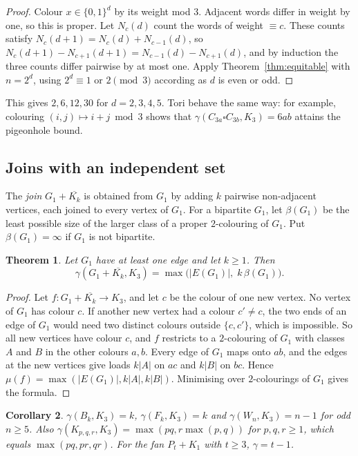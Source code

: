 \documentclass{article}
\newtheorem{theorem}{Theorem}[section]
\newtheorem{corollary}[theorem]{Corollary}
\theoremstyle{definition}
\begin{document}
\begin{proof}
Colour $x\in\{0,1\}^d$ by its weight mod $3$.  Adjacent words differ in weight by
one, so this is proper.  Let $N_c(d)$ count the words of weight $\equiv c$.  These
counts satisfy $N_c(d+1)=N_c(d)+N_{c-1}(d)$, so
$N_c(d+1)-N_{c+1}(d+1)=N_{c-1}(d)-N_{c+1}(d)$, and by induction the three counts
differ pairwise by at most one.  Apply Theorem~\ref{thm:equitable} with
$n=2^d$, using $2^d\equiv1$ or $2\pmod 3$ according as $d$ is even or odd.
\end{proof}

This gives $2,6,12,30$ for $d=2,3,4,5$.  Tori behave the same way: for
example, colouring $(i,j)\mapsto i+j\bmod 3$ shows that
$\gamma(C_{3a}\square C_{3b},K_3)=6ab$ attains the pigeonhole bound.

\subsection{Joins with an independent set}

The \emph{join} $G_1+\overline{K_k}$ is obtained from $G_1$ by adding $k$
pairwise non-adjacent vertices, each joined to every vertex of $G_1$.  For a
bipartite $G_1$, let $\beta(G_1)$ be the least possible size of the larger class
of a proper $2$-colouring of $G_1$.  Put $\beta(G_1)=\infty$ if $G_1$ is not
bipartite.

\begin{theorem}
\label{thm:join}
Let $G_1$ have at least one edge and let $k\ge1$.  Then
\[
  \gamma(G_1+\overline{K_k},K_3)=\max\bigl(|E(G_1)|,\;k\,\beta(G_1)\bigr).
\]
\end{theorem}

\begin{proof}
Let $f\colon G_1+\overline{K_k}\to K_3$, and let $c$ be the colour of one new
vertex.  No vertex of $G_1$ has colour $c$.  If another new vertex had a colour
$c'\ne c$, the two ends of an edge of $G_1$ would need two distinct colours
outside $\{c,c'\}$, which is impossible.  So all new vertices have colour $c$, and
$f$ restricts to a $2$-colouring of $G_1$ with classes $A$ and $B$ in the other
colours $a,b$.  Every edge of $G_1$ maps onto $ab$, and the edges at the new
vertices give loads $k|A|$ on $ac$ and $k|B|$ on $bc$.  Hence
$\mu(f)=\max(|E(G_1)|,k|A|,k|B|)$.  Minimising over $2$-colourings of $G_1$ gives
the formula.
\end{proof}

\begin{corollary}
\label{cor:join}
$\gamma(B_k,K_3)=k$, $\gamma(F_k,K_3)=k$ and $\gamma(W_n,K_3)=n-1$ for odd
$n\ge5$.  Also $\gamma(K_{p,q,r},K_3)=\max(pq,r\max(p,q))$ for $p,q,r\ge1$, which
equals $\max(pq,pr,qr)$.  For the fan $P_t+K_1$ with $t\ge3$,
$\gamma=t-1$.
\end{corollary}
\end{document}
